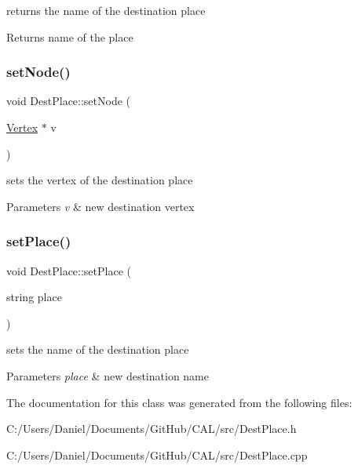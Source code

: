 returns the name of the destination place 

\begin{DoxyReturn}{Returns}
name of the place 
\end{DoxyReturn}
\hypertarget{class_dest_place_a8aef31bff80b7fac1ce940a7805efb57}{}\label{class_dest_place_a8aef31bff80b7fac1ce940a7805efb57} 
\subsubsection{\texorpdfstring{set\+Node()}{setNode()}}
{\footnotesize\ttfamily void Dest\+Place\+::set\+Node (\begin{DoxyParamCaption}\item[{\hyperlink{class_vertex}{Vertex} $\ast$}]{v }\end{DoxyParamCaption})}



sets the vertex of the destination place 


\begin{DoxyParams}{Parameters}
{\em v} & new destination vertex \\
\hline
\end{DoxyParams}
\hypertarget{class_dest_place_acf1a352c9061e706bbb6fd360273505c}{}\label{class_dest_place_acf1a352c9061e706bbb6fd360273505c} 
\subsubsection{\texorpdfstring{set\+Place()}{setPlace()}}
{\footnotesize\ttfamily void Dest\+Place\+::set\+Place (\begin{DoxyParamCaption}\item[{string}]{place }\end{DoxyParamCaption})}



sets the name of the destination place 


\begin{DoxyParams}{Parameters}
{\em place} & new destination name \\
\hline
\end{DoxyParams}


The documentation for this class was generated from the following files\+:\begin{DoxyCompactItemize}
\item 
C\+:/\+Users/\+Daniel/\+Documents/\+Git\+Hub/\+C\+A\+L/src/Dest\+Place.\+h\item 
C\+:/\+Users/\+Daniel/\+Documents/\+Git\+Hub/\+C\+A\+L/src/Dest\+Place.\+cpp\end{DoxyCompactItemize}
